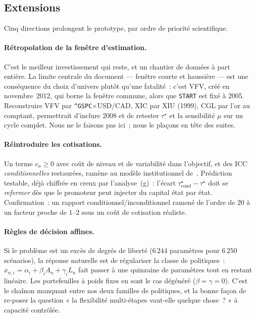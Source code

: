 \documentclass[11pt,letterpaper]{article}
\newcommand{\taustar}{\tau^{\star}}
\theoremstyle{definition}
\begin{document}
\subsection{Extensions}\label{ssec:extensions}

Cinq directions prolongent le prototype, par ordre de priorité scientifique.

\paragraph{Rétropolation de la fenêtre d'estimation.}
C'est le meilleur investissement qui reste, et un chantier de données à part
entière. La limite centrale du document --- fenêtre courte et haussière --- est
une conséquence du choix d'univers plutôt qu'une fatalité~: c'est VFV, créé en
novembre~2012, qui borne la fenêtre commune, alors que \texttt{START} est fixé
à $2005$. Reconstruire VFV par \texttt{\textasciicircum GSPC}$\times$USD/CAD,
XIC par XIU (1999), CGL par l'or au comptant, permettrait d'inclure $2008$ et de
retester $\taustar$ et la sensibilité $\mu$ sur un cycle complet. Nous ne le
faisons pas ici~; nous le plaçons en tête des suites.

\paragraph{Réintroduire les cotisations.}
Un terme $c_n \ge 0$ avec coût de niveau et de variabilité dans l'objectif, et
des ICC \emph{conditionnelles} restaurées, ramène au modèle institutionnel
de~\cite{KHSV2010}. Prédiction testable, déjà chiffrée en creux par
l'analyse~(g)~: l'écart $\taustar_{\mathrm{cond}} - \taustar$ doit se
\emph{refermer} dès que le promoteur peut injecter du capital état par état.
Confirmation~: un rapport conditionnel/inconditionnel ramené de l'ordre de
$20$ à un facteur proche de $1$--$2$ sous un coût de cotisation réaliste.

\paragraph{Règles de décision affines.}
Si le problème est un excès de degrés de liberté ($6\,244$ paramètres pour
$6\,250$ scénarios), la réponse naturelle est de régulariser la classe de
politiques~: $x_{n,i} = \alpha_i + \beta_i A_n + \gamma_i L_n$ fait passer à une
quinzaine de paramètres tout en restant linéaire. Les portefeuilles à poids
fixes en sont le cas dégénéré ($\beta = \gamma = 0$). C'est le chaînon
manquant entre nos deux familles de politiques, et la bonne façon de
re-poser la question « la flexibilité multi-étapes vaut-elle quelque
chose~? » à capacité contrôlée.
\end{document}
